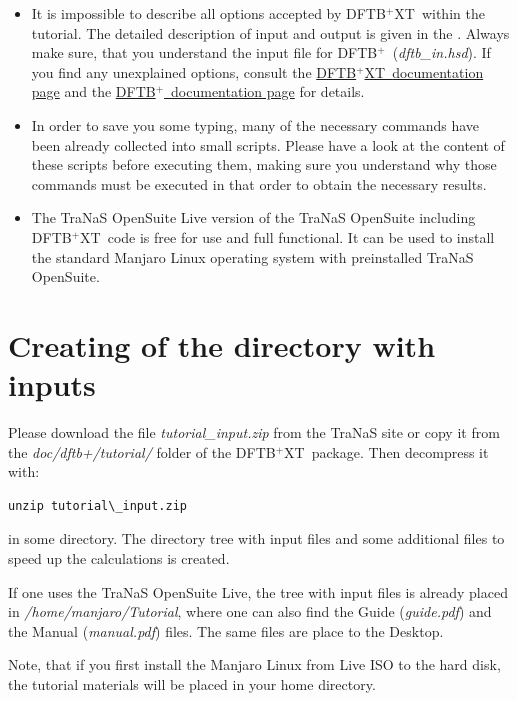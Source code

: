 \documentclass[a4paper,11pt,english]{sphinxmanual}
\newcommand{\dftbp}{\textsf{DFTB$^{\text{+}}$\ }} %
\newcommand{\dftbpxt}{\textsf{DFTB$^{\text{+}}$XT\ }} %
\newcommand{\is}[1]{{\sffamily{#1}}}
\begin{document}
{{\begin{itemize}
\item {} 
It is impossible to describe all options accepted by \dftbpxt within
the tutorial. The detailed description of input and output is given in the \is{USER MANUAL}.
Always make sure, that you understand the input file
for \dftbp (\emph{dftb\_in.hsd}). If you find any unexplained options,
consult the \href{http://tranas.org/opensuite/documentation.html}{\dftbpxt documentation page} and the \href{http://www.dftbplus.org/documentation/}{\dftbp documentation page} for details.

\item {} 
In order to save you some typing, many of the necessary commands
have been already collected into small scripts. Please have a look
at the content of these scripts before executing them, making sure
you understand why those commands must be executed in that order to
obtain the necessary results.

\item {} 
The {\textsf{TraNaS OpenSuite Live}} version of the \textsf{TraNaS OpenSuite} including \dftbpxt code is free for use and full functional.
It can be used to install the standard Manjaro Linux operating system with preinstalled \textsf{TraNaS OpenSuite}.

\end{itemize}

\section{Creating of the directory with inputs}

Please download the file \emph{tutorial\_input.zip} from the TraNaS site or copy it from the \emph{doc/dftb+/tutorial/} folder of the \dftbpxt package. Then decompress it with:
%
\begin{Verbatim}[commandchars=\\\{\}]
unzip tutorial\_input.zip
\end{Verbatim}

in some directory. The directory tree with input files and some additional files to speed up the calculations is created.

\null
If one uses the {\textsf{TraNaS OpenSuite Live}}, the tree with input files is already placed in \emph{/home/manjaro/Tutorial}, where one can also find the Guide (\emph{guide.pdf}) and the Manual (\emph{manual.pdf}) files. The same files are place to the Desktop.

\null
Note, that if you first install the Manjaro Linux from Live ISO to the hard disk, the tutorial materials will be placed in your home directory.

}}
\end{document}
